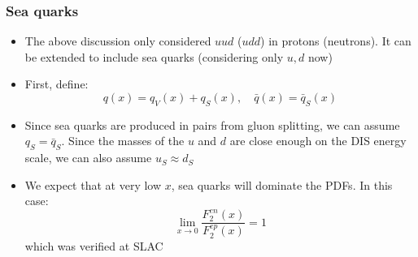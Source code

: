\documentclass[11pt]{article}
\newcommand{\qbar}{{\bar{q}}}
\begin{document}
\subsubsection{Sea quarks}
\begin{itemize}
  \item The above discussion only considered $uud$ ($udd$) in protons (neutrons). It can be extended to include sea quarks (considering only $u,d$ now)
  \item First, define:
  \begin{equation}
    q(x) = q_V(x) + q_S(x), \quad \qbar(x) = \qbar_S(x)
  \end{equation}
  \item Since sea quarks are produced in pairs from gluon splitting, we can assume $q_S = \qbar_S$. Since the masses of the $u$ and $d$ are close enough on the DIS energy scale, we can also assume $u_S \approx d_S$
  \item We expect that at very low $x$, sea quarks will dominate the PDFs. In this case:
  \begin{equation}
    \lim_{x\rightarrow 0} \frac{F_2^{en}(x)}{F_2^{ep}(x)} = 1
  \end{equation}
  which was verified at SLAC
\end{itemize}
\end{document}
